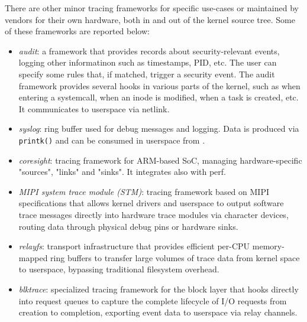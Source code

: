 There are other minor tracing frameworks for specific use-cases or maintained by
vendors for their own hardware, both in and out of the kernel source tree.
Some of these frameworks are reported below:

\begin{itemize}

  \item \textit{audit}: a framework that provides records about
    security-relevant events, logging other informatinon such as timestamps,
    PID, etc. The user can specify some rules that, if matched, trigger a
    security event. The audit framework provides several hooks in various parts
    of the kernel, such as when entering a systemcall, when an inode is
    modified, when a task is created, etc. It communicates to userspace via
    netlink.

  \item \textit{syslog}: ring buffer used for debug messages and logging. Data
    is produced via \verb|printk()| and can be consumed in userspace from
    .

  \item \textit{coresight}: tracing framework for ARM-based SoC, managing
    hardware-specific "sources", "links" and "sinks". It integrates also with
    perf.

  \item \textit{MIPI system trace module (STM)}: tracing framework based on
    MIPI specifications that allows kernel drivers and userspace to output
    software trace messages directly into hardware trace modules via character
    devices, routing data through physical debug pins or hardware sinks.

  \item \textit{relayfs}: transport infrastructure that provides efficient
    per-CPU memory-mapped ring buffers to transfer large volumes of trace data
    from kernel space to userspace, bypassing traditional filesystem overhead.

  \item \textit{blktrace}: specialized tracing framework for the block layer
    that hooks directly into request queues to capture the complete lifecycle of
    I/O requests from creation to completion, exporting event data to userspace
    via relay channels.

\end{itemize}
